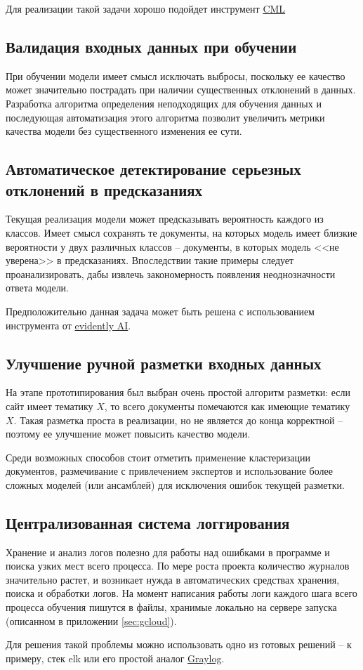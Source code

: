     Для реализации такой задачи хорошо подойдет инструмент \href{https://cml.dev/}{CML}
    \subsection{Валидация входных данных при обучении}
    При обучении модели имеет смысл исключать выбросы, поскольку ее качество может значительно пострадать при наличии существенных отклонений в данных.
    Разработка алгоритма определения неподходящих для обучения данных и последующая автоматизация этого алгоритма позволит увеличить метрики качества модели без существенного изменения ее сути.
    \subsection{Автоматическое детектирование серьезных отклонений в предсказаниях}
    Текущая реализация модели может предсказывать вероятность каждого из классов.
    Имеет смысл сохранять те документы, на которых модель имеет близкие вероятности у двух различных классов -- документы, в которых модель <<не уверена>> в предсказаниях.
    Впоследствии такие примеры следует проанализировать, дабы извлечь закономерность появления неоднозначности ответа модели.

    Предположительно данная задача может быть решена с использованием инструмента от \href{https://evidentlyai.com/}{evidently AI}.
    \subsection{Улучшение ручной разметки входных данных}
    На этапе прототипирования был выбран очень простой алгоритм разметки: если сайт имеет тематику $X$, то всего документы помечаются как имеющие тематику $X$.
    Такая разметка проста в реализации, но не является до конца корректной -- поэтому ее улучшение может повысить качество модели.

    Среди возможных способов стоит отметить применение кластеризации документов, размечивание с привлечением экспертов и использование более сложных моделей (или ансамблей) для исключения ошибок текущей разметки.
    \subsection{Централизованная система логгирования}
    Хранение и анализ логов полезно для работы над ошибками в программе и поиска узких мест всего процесса.
    По мере роста проекта количество журналов значительно растет, и возникает нужда в автоматических средствах хранения, поиска и обработки логов.
    На момент написания работы логи каждого шага всего процесса обучения пишутся в файлы, хранимые локально на сервере запуска (описанном в приложении \ref{sec:gcloud}).

    Для решения такой проблемы можно использовать одно из готовых решений -- к примеру, стек \gls{elk} или его простой аналог \href{https://www.graylog.org/}{Graylog}.
